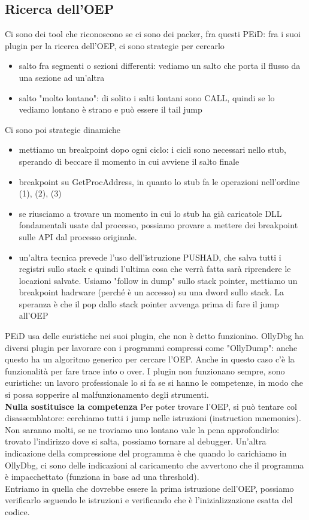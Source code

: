\documentclass[12pt, oneside]{extbook}
\begin{document}
\subsection{Ricerca dell'OEP}
Ci sono dei tool che riconoscono se ci sono dei packer, fra questi PEiD: fra i suoi plugin per la ricerca dell'OEP, ci sono strategie per cercarlo
\begin{itemize}
\item salto fra segmenti o sezioni differenti: vediamo un salto che porta il flusso da una sezione ad un'altra
\item salto "molto lontano": di solito i salti lontani sono CALL, quindi se lo vediamo lontano è strano e può essere il tail jump
\end{itemize}
Ci sono poi strategie dinamiche
\begin{itemize}
\item mettiamo un breakpoint dopo ogni ciclo: i cicli sono necessari nello stub, sperando di beccare il momento in cui avviene il salto finale
\item breakpoint su GetProcAddress, in quanto lo stub fa le operazioni nell'ordine (1), (2), (3)
\item se riusciamo a trovare un momento in cui lo stub ha già caricatole DLL fondamentali usate dal processo, possiamo provare a mettere dei breakpoint sulle API dal processo originale.
\item un'altra tecnica prevede l'uso dell'istruzione PUSHAD, che salva tutti i registri sullo stack e quindi l'ultima cosa che verrà fatta sarà riprendere le locazioni salvate. Usiamo "follow in dump" sullo stack pointer, mettiamo un breakpoint hadrware (perché è un accesso) su una dword sullo stack. La speranza è che il pop dallo stack pointer avvenga prima di fare il jump all'OEP
\end{itemize}
PEiD usa delle euristiche nei suoi plugin, che non è detto funzionino. OllyDbg ha diversi plugin per lavorare con i programmi compressi come "OllyDump": anche questo ha un algoritmo generico per cercare l'OEP. Anche in questo caso c'è la funzionalità per fare trace into o over. I plugin non funzionano sempre, sono euristiche: un lavoro professionale lo si fa se si hanno le competenze, in modo che si possa sopperire al malfunzionamento degli strumenti.\\ \textbf{\textsf{Nulla sostituisce la competenza}}
Per poter trovare l'OEP, si può tentare col disassemblatore: cerchiamo tutti i jump nelle istruzioni (instruction mnemonics). Non saranno molti, se ne troviamo uno lontano vale la pena approfondirlo: trovato l'indirizzo dove si salta, possiamo tornare al debugger. Un'altra indicazione della compressione del programma è che quando lo carichiamo in OllyDbg, ci sono delle indicazioni al caricamento che avvertono che il programma è impacchettato (funziona in base ad una threshold).\\Entriamo in quella che dovrebbe essere la prima istruzione dell'OEP, possiamo verificarlo seguendo le istruzioni e verificando che è l'inizializzazione esatta del codice.
\end{document}
